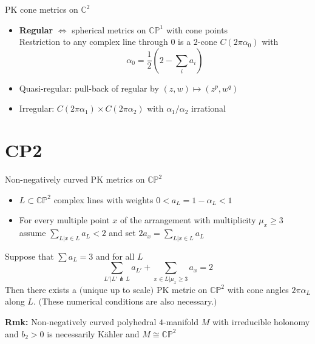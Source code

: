 \documentclass{beamer}
\newcommand{\C}{\mathbb{C}}
\newcommand{\CP}{\mathbb{CP}}
\begin{document}
\begin{frame}{PK cone metrics on \(\C^2\)}
\begin{center}
{
	}
\end{center}
	

			\begin{itemize}
				\item \textbf{Regular}  \(\iff\) spherical metrics on \(\CP^1\) with cone points \\
				Restriction to any complex line through \(0\) is a \(2\)-cone \(C(2\pi\alpha_0)\) with
				\[\alpha_0 = \frac{1}{2} \left(2 - \sum_i a_i\right) \tag{holonomy Hopf = 2 area}\]
				\item Quasi-regular: pull-back of regular by \((z, w) \mapsto (z^p, w^q)\)
				\item Irregular: \(C(2\pi\alpha_1) \times C(2\pi\alpha_2)\) with \(\alpha_1/\alpha_2\) irrational
			\end{itemize}	
\end{frame}

\section{CP2}

\begin{frame}{Non-negatively curved PK metrics on \(\CP^2\)}
	\begin{itemize}
		\item \(L \subset \CP^2\) complex lines with weights \(0<a_L=1-\alpha_L<1\)
		\item For every multiple point \(x\) of the arrangement  with multiplicity \(\mu_x \geq 3\) assume \(\sum_{L| x \in L} a_L < 2\) and set \(2 a_x = \sum_{L| x \in L} a_L\)
	\end{itemize}
	
	\begin{theorem}[Panov, 2009]
		Suppose that \(\sum a_L = 3\) and for all \(L\)
		\[ \tag{GB}
		\sum_{L'|L' \pitchfork L} a_{L'} + \sum_{x \in L| \mu_x\geq 3} a_x =2  \]
		Then there exists a \(\mathrm{(}\)unique up to scale\(\mathrm{)}\) PK metric on \(\CP^2\) with cone angles \(2\pi\alpha_L\) along \(L\). \(\mathrm{(}\)These numerical conditions are also necessary.\(\mathrm{)}\)
	\end{theorem}

\textbf{Rmk:} Non-negatively curved polyhedral \(4\)-manifold \(M\) with irreducible holonomy and \(b_2>0\) is necessarily K\"ahler and \(M\cong \CP^2\)
\end{frame}
\end{document}
